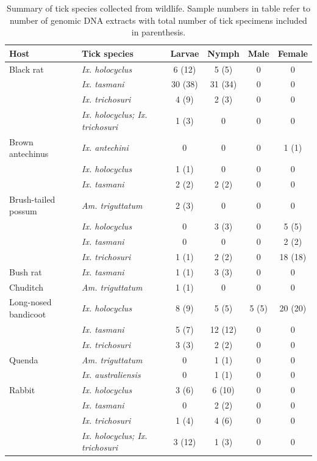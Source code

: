 \documentclass[a4paper, nobind]{templates/ociamthesis}
\begin{document}
\begin{table}

\caption[Summary of tick species collected from wildlife hosts for bacterial profiling.]{\label{tab:T3ticks}Summary of tick species collected from wildlife. Sample numbers in table refer to number of genomic DNA extracts with total number of tick specimens included in parenthesis.}
\centering
\fontsize{8.5}{10.5}\selectfont
\begin{tabular}[t]{l>{}lcccc}
\toprule
Host & Tick species & Larvae & Nymph & Male & Female\\
\midrule
Black rat & \em{Ix. holocyclus} & 6 (12) & 5 (5) & 0 & 0\\
 & \em{Ix. tasmani} & 30 (38) & 31 (34) & 0 & 0\\
 & \em{Ix. trichosuri} & 4 (9) & 2 (3) & 0 & 0\\
 & \em{Ix. holocyclus; Ix. trichosuri} & 1 (3) & 0 & 0 & 0\\
Brown antechinus & \em{Ix. antechini} & 0 & 0 & 0 & 1 (1)\\
 & \em{Ix. holocyclus} & 1 (1) & 0 & 0 & 0\\
 & \em{Ix. tasmani} & 2 (2) & 2 (2) & 0 & 0\\
Brush-tailed possum & \em{Am. triguttatum} & 2 (3) & 0 & 0 & 0\\
 & \em{Ix. holocyclus} & 0 & 3 (3) & 0 & 5 (5)\\
 & \em{Ix. tasmani} & 0 & 0 & 0 & 2 (2)\\
 & \em{Ix. trichosuri} & 1 (1) & 2 (2) & 0 & 18 (18)\\
Bush rat & \em{Ix. tasmani} & 1 (1) & 3 (3) & 0 & 0\\
Chuditch & \em{Am. triguttatum} & 1 (1) & 0 & 0 & 0\\
Long-nosed bandicoot & \em{Ix. holocyclus} & 8 (9) & 5 (5) & 5 (5) & 20 (20)\\
 & \em{Ix. tasmani} & 5 (7) & 12 (12) & 0 & 0\\
 & \em{Ix. trichosuri} & 3 (3) & 2 (2) & 0 & 0\\
Quenda & \em{Am. triguttatum} & 0 & 1 (1) & 0 & 0\\
 & \em{Ix. australiensis} & 0 & 1 (1) & 0 & 0\\
Rabbit & \em{Ix. holocyclus} & 3 (6) & 6 (10) & 0 & 0\\
 & \em{Ix. tasmani} & 0 & 2 (2) & 0 & 0\\
 & \em{Ix. trichosuri} & 1 (4) & 4 (6) & 0 & 0\\
 & \em{Ix. holocyclus; Ix. trichosuri} & 3 (12) & 1 (3) & 0 & 0\\
\bottomrule
\end{tabular}
\end{table}
\end{document}
